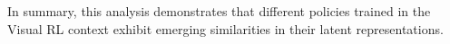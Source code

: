 In summary, this analysis demonstrates that different policies trained in the Visual RL context exhibit emerging similarities in their latent representations.




